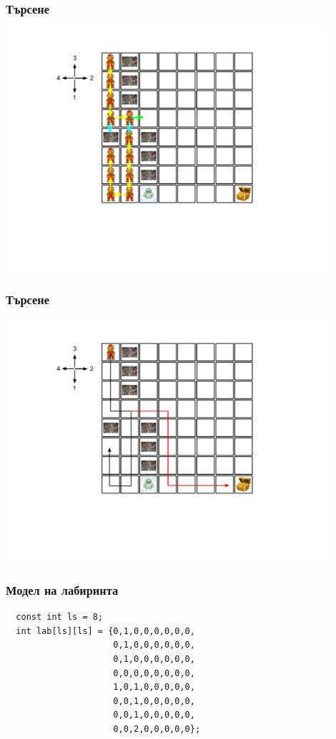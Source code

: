 \documentclass{beamer}
\begin{document}
\begin{frame}[fragile]
\frametitle{Търсене}
\includegraphics[width=12cm]{images/lab_st_02}
\end{frame}


\begin{frame}[fragile]
\frametitle{Търсене}
\includegraphics[width=12cm]{images/lab_sol}
\end{frame}


\begin{frame}[fragile]
\frametitle{Модел на лабиринта}
\begin{lstlisting}
  const int ls = 8; 
  int lab[ls][ls] = {0,1,0,0,0,0,0,0,
                     0,1,0,0,0,0,0,0,
                     0,1,0,0,0,0,0,0,
                     0,0,0,0,0,0,0,0,
                     1,0,1,0,0,0,0,0,
                     0,0,1,0,0,0,0,0,
                     0,0,1,0,0,0,0,0,
                     0,0,2,0,0,0,0,0};
\end{lstlisting}

\end{frame}
\end{document}
